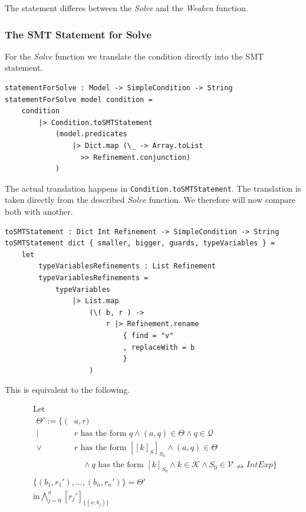 \documentclass[]{scrbook}
\theoremstyle{definition}
\theoremstyle{definition}
\theoremstyle{definition}
\theoremstyle{remark}
\begin{document}
The statement differes between the \emph{Solve} and the \emph{Weaken}
function.

\subsubsection{The SMT Statement for
Solve}\label{the-smt-statement-for-solve}

For the \emph{Solve} function we translate the condition directly into
the SMT statement.

\begin{verbatim}
statementForSolve : Model -> SimpleCondition -> String
statementForSolve model condition =
    condition
        |> Condition.toSMTStatement
            (model.predicates
                |> Dict.map (\_ -> Array.toList 
                  >> Refinement.conjunction)
            )
\end{verbatim}

The actual translation happens in \texttt{Condition.toSMTStatement}. The
translation is taken directly from the described \emph{Solve} function.
We therefore will now compare both with another.

\text{\textemdash}

\begin{verbatim}
toSMTStatement : Dict Int Refinement -> SimpleCondition -> String
toSMTStatement dict { smaller, bigger, guards, typeVariables } =
    let
        typeVariablesRefinements : List Refinement
        typeVariablesRefinements =
            typeVariables
                |> List.map
                    (\( b, r ) ->
                        r |> Refinement.rename 
                            { find = "v"
                            , replaceWith = b
                            }
                    )
\end{verbatim}

This is equivalent to the following.

\[
\begin{aligned}
&\text{Let}\\
&\begin{aligned}
  \Theta':= \{\ (&a,r)\\
   | \ &r \text{ has the form } q \land (a,q)\in\Theta \land q\in\mathcal{Q}\\
  \lor \ &r \text{ has the form } [[k]_S]_{S_0}\land (a,q)\in\Theta\\
  &\quad\land q \text{ has the form } [k]_{S_0} \land k\in\mathcal{K} \land S_0\in\mathcal{V}\nrightarrow\mathit{IntExp}\}
  \end{aligned}\\
&\{(b_1,r_1'),\dots,(b_n,r_n')\}=\Theta'\\
&\text{in}
\bigwedge_{j=0}^n [r_j']_{\{(\nu,b_j)\}}
\end{aligned}
\]
\end{document}
